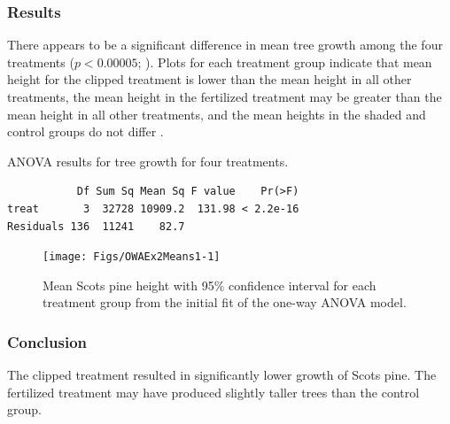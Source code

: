 \documentclass[10pt,openany]{book}\usepackage[]{graphicx}\usepackage[]{color}
\makeatletter
\newenvironment{kframe}{%
 \def\at@end@of@kframe{}%
 \ifinner\ifhmode%
  \def\at@end@of@kframe{\end{minipage}}%
  \begin{minipage}{\columnwidth}%
 \fi\fi%
 \def\FrameCommand##1{\hskip\@totalleftmargin \hskip-\fboxsep
 \colorbox{shadecolor}{##1}\hskip-\fboxsep
     \hskip-\linewidth \hskip-\@totalleftmargin \hskip\columnwidth}%
 \MakeFramed {\advance\hsize-\width
   \@totalleftmargin\z@ \linewidth\hsize
   \@setminipage}}%
 {\par\unskip\endMakeFramed%
 \at@end@of@kframe}
\newenvironment{knitrout}{}{} %
\makeatother
\begin{document}
\subsubsection*{Results}
There appears to be a significant difference in mean tree growth among the four treatments ($p<0.00005$; ).  Plots for each treatment group indicate that mean height for the clipped treatment is lower than the mean height in all other treatments, the mean height in the fertilized treatment may be greater than the mean height in all other treatments, and the mean heights in the shaded and control groups do not differ .

\begin{table}[h]
  \centering
  \caption{ANOVA results for tree growth for four treatments.}\label{tab:OWAEx2ANOVA}
\begin{knitrout}
\color{fgcolor}\begin{kframe}
\begin{verbatim}
           Df Sum Sq Mean Sq F value    Pr(>F)
treat       3  32728 10909.2  131.98 < 2.2e-16
Residuals 136  11241    82.7                  
\end{verbatim}
\end{kframe}
\end{knitrout}
\end{table}

\begin{knitrout}
\color{fgcolor}\begin{figure}[hbtp]

{\centering \texttt{[image: Figs/OWAEx2Means1-1]} 

}

\caption[Mean Scots pine height with 95\% confidence interval for each treatment group from the initial fit of the one-way ANOVA model]{Mean Scots pine height with 95\% confidence interval for each treatment group from the initial fit of the one-way ANOVA model.}\label{fig:OWAEx2Means1}
\end{figure}


\end{knitrout}

\subsubsection*{Conclusion}
The clipped treatment resulted in significantly lower growth of Scots pine.  The fertilized treatment may have produced slightly taller trees than the control group.
\end{document}

